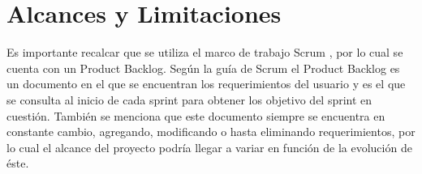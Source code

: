 

\section{Alcances y Limitaciones}
\label{sec:alcancesLimitaciones}

%

Es importante recalcar que se utiliza el marco de trabajo Scrum \cite{scrum1}, por lo cual se cuenta con un Product Backlog. Según la guía de Scrum \cite{scrum2} el Product Backlog es un documento en el que se encuentran los requerimientos del usuario y es el que se consulta al inicio de cada sprint para obtener los objetivo del sprint en cuestión. También se menciona que este documento siempre se encuentra en constante cambio, agregando, modificando o hasta eliminando requerimientos, por lo cual el alcance del proyecto podría llegar a variar en función de la evolución de éste.

